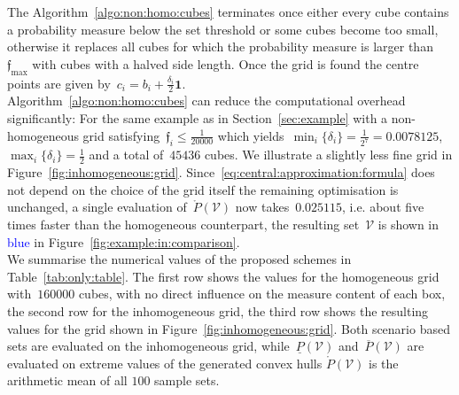 \documentclass[letterpaper, 10pt, conference]{ieeeconf} %
\providecommand{\bfa}[1]{\mathbf{#1}}
\begin{document}
%
The Algorithm~\ref{algo:non:homo:cubes} terminates once either every cube contains a probability measure below the set threshold or some cubes become too small, otherwise it replaces all cubes for which the probability measure is larger than~$\mathfrak{f}_{\max}$ with cubes with a halved side length.
%
Once the grid is found the centre points are given by~$c_i=b_i+\frac{\delta_i}{2}\bfa{1}$.
%
\\[1em]
%
Algorithm~\ref{algo:non:homo:cubes} can reduce the computational overhead significantly:
%
For the same example as in Section~\ref{sec:example} with a non-homogeneous grid satisfying~$\mathfrak{f}_i\leq\frac{1}{20000}$ which yields~$\min_i\{\delta_i\}=\frac{1}{2^7}=0.0078125$,~$\max_i\{\delta_i\}=\frac{1}{2}$ and a total of~$45436$ cubes.
%
We illustrate a slightly less fine grid in Figure~\ref{fig:inhomogeneous:grid}.
%
Since~\eqref{eq:central:approximation:formula} does not depend on the choice of the grid itself the remaining optimisation is unchanged, a single evaluation of~$\mathring{P}(\mathcal V)$ now takes~$0.025115$, i.e. about five times  faster than the homogeneous counterpart, the resulting set~$\mathcal V$ is shown in \textcolor{blue}{blue} in Figure~\ref{fig:example:in:comparison}.
%
\\[1em]
%
We summarise the numerical values of the proposed schemes in Table~\ref{tab:only:table}.
%
The first row shows the values for the homogeneous grid with~$160000$ cubes, with no direct influence on the measure content of each box, the second row for the inhomogeneous grid, the third row shows the resulting values for the grid shown in Figure~\ref{fig:inhomogeneous:grid}. 
%
Both scenario based sets are evaluated on the inhomogeneous grid, while~$\underline{P}(\mathcal V)$ and~$\overline{P}(\mathcal V)$ are evaluated on extreme values of the generated convex hulls $\mathring{P}(\mathcal V)$ is the arithmetic mean of all $100$ sample sets.
%
\end{document}
